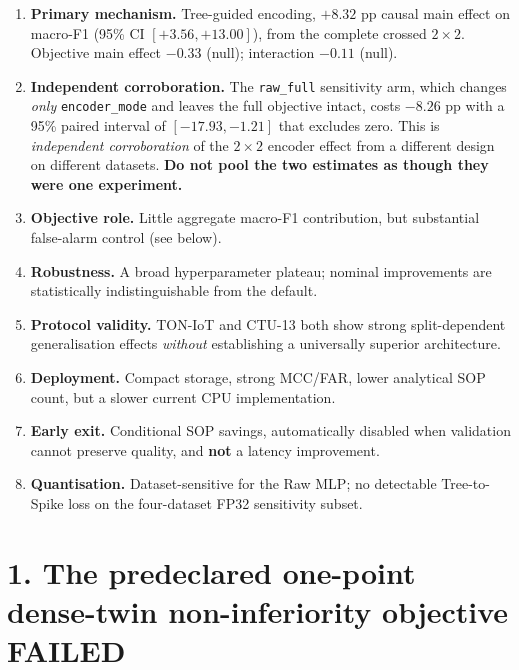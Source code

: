 \begin{enumerate}
  \item \textbf{Primary mechanism.} Tree-guided encoding, $+8.32$ pp causal main
        effect on macro-F1 (95\% CI $[+3.56, +13.00]$), from the complete crossed
        $2\times2$. Objective main effect $-0.33$ (null); interaction $-0.11$ (null).
  \item \textbf{Independent corroboration.} The \texttt{raw\_full} sensitivity arm,
        which changes \emph{only} \texttt{encoder\_mode} and leaves the full objective
        intact, costs $-8.26$ pp with a 95\% paired interval of $[-17.93, -1.21]$ that
        excludes zero. This is \emph{independent corroboration} of the $2\times2$
        encoder effect from a different design on different datasets. \textbf{Do not
        pool the two estimates as though they were one experiment.}
  \item \textbf{Objective role.} Little aggregate macro-F1 contribution, but
        substantial false-alarm control (see below).
  \item \textbf{Robustness.} A broad hyperparameter plateau; nominal improvements are
        statistically indistinguishable from the default.
  \item \textbf{Protocol validity.} TON-IoT and CTU-13 both show strong
        split-dependent generalisation effects \emph{without} establishing a
        universally superior architecture.
  \item \textbf{Deployment.} Compact storage, strong MCC/FAR, lower analytical SOP
        count, but a slower current CPU implementation.
  \item \textbf{Early exit.} Conditional SOP savings, automatically disabled when
        validation cannot preserve quality, and \textbf{not} a latency improvement.
  \item \textbf{Quantisation.} Dataset-sensitive for the Raw MLP; no detectable
        Tree-to-Spike loss on the four-dataset FP32 sensitivity subset.
\end{enumerate}

\section*{1. The predeclared one-point dense-twin non-inferiority objective FAILED}

